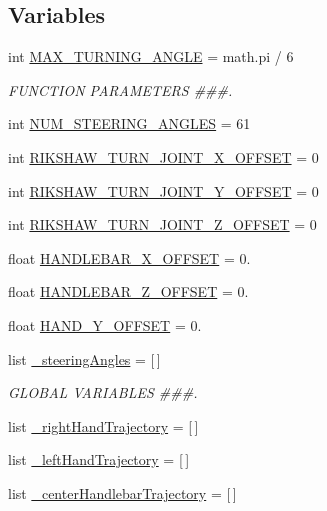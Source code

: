 \subsection*{Variables}
\begin{DoxyCompactItemize}
\item 
int \mbox{\hyperlink{namespacecompute__steering__path_af605bf2d99fa72502d408830b1b59823}{M\+A\+X\+\_\+\+T\+U\+R\+N\+I\+N\+G\+\_\+\+A\+N\+G\+LE}} = math.\+pi / 6
\begin{DoxyCompactList}\small\item\em F\+U\+N\+C\+T\+I\+ON P\+A\+R\+A\+M\+E\+T\+E\+RS \#\#\#. \end{DoxyCompactList}\item 
int \mbox{\hyperlink{namespacecompute__steering__path_a1ed68b9d234ad195922a5d6d02ee79aa}{N\+U\+M\+\_\+\+S\+T\+E\+E\+R\+I\+N\+G\+\_\+\+A\+N\+G\+L\+ES}} = 61
\item 
int \mbox{\hyperlink{namespacecompute__steering__path_a3f4b472418e5fd7d3372b9b3817a7fc5}{R\+I\+K\+S\+H\+A\+W\+\_\+\+T\+U\+R\+N\+\_\+\+J\+O\+I\+N\+T\+\_\+\+X\+\_\+\+O\+F\+F\+S\+ET}} = 0
\item 
int \mbox{\hyperlink{namespacecompute__steering__path_a1586493cf5c292599b5b88499d15415f}{R\+I\+K\+S\+H\+A\+W\+\_\+\+T\+U\+R\+N\+\_\+\+J\+O\+I\+N\+T\+\_\+\+Y\+\_\+\+O\+F\+F\+S\+ET}} = 0
\item 
int \mbox{\hyperlink{namespacecompute__steering__path_aa57a41d7e87ace0fb1989333822c4a5c}{R\+I\+K\+S\+H\+A\+W\+\_\+\+T\+U\+R\+N\+\_\+\+J\+O\+I\+N\+T\+\_\+\+Z\+\_\+\+O\+F\+F\+S\+ET}} = 0
\item 
float \mbox{\hyperlink{namespacecompute__steering__path_a337ab7ed2358648543af5d1375eef904}{H\+A\+N\+D\+L\+E\+B\+A\+R\+\_\+\+X\+\_\+\+O\+F\+F\+S\+ET}} = 0.
\item 
float \mbox{\hyperlink{namespacecompute__steering__path_afd498ef6c64ef66c0ef7e0f0f4798179}{H\+A\+N\+D\+L\+E\+B\+A\+R\+\_\+\+Z\+\_\+\+O\+F\+F\+S\+ET}} = 0.
\item 
float \mbox{\hyperlink{namespacecompute__steering__path_a07f2001c6e5a0ae52495d2eb31f00bd9}{H\+A\+N\+D\+\_\+\+Y\+\_\+\+O\+F\+F\+S\+ET}} = 0.
\item 
list \mbox{\hyperlink{namespacecompute__steering__path_ab0588b81b30d22770a83a900be1fbca9}{\+\_\+steering\+Angles}} = \mbox{[}$\,$\mbox{]}
\begin{DoxyCompactList}\small\item\em G\+L\+O\+B\+AL V\+A\+R\+I\+A\+B\+L\+ES \#\#\#. \end{DoxyCompactList}\item 
list \mbox{\hyperlink{namespacecompute__steering__path_a8dad8bbc8f2af1f63876a78242a0da43}{\+\_\+right\+Hand\+Trajectory}} = \mbox{[}$\,$\mbox{]}
\item 
list \mbox{\hyperlink{namespacecompute__steering__path_a20e0028691b419d3f7721c0acd4a06ac}{\+\_\+left\+Hand\+Trajectory}} = \mbox{[}$\,$\mbox{]}
\item 
list \mbox{\hyperlink{namespacecompute__steering__path_af3ecc414817ba429eb9b24c06e91efe6}{\+\_\+center\+Handlebar\+Trajectory}} = \mbox{[}$\,$\mbox{]}
\end{DoxyCompactItemize}


